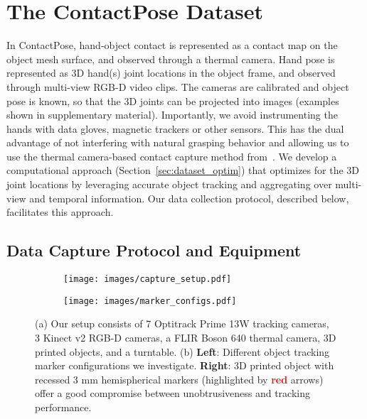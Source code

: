 \documentclass[runningheads]{llncs}
\begin{document}
 \section{The ContactPose Dataset} \label{sec:dataset}
In ContactPose, hand-object contact is represented as a contact map on the object mesh surface, and observed through a thermal camera. Hand pose is represented as 3D hand(s) joint locations in the object frame, and observed through multi-view RGB-D video clips. The cameras are calibrated and object pose is known, so that the 3D joints can be projected into images (examples shown in supplementary material). Importantly, we avoid instrumenting the hands with data gloves, magnetic trackers or other sensors. This has the dual advantage of not interfering with natural grasping behavior and allowing us to use the thermal camera-based contact capture method from~\cite{contactdbv1}. We develop a computational approach (Section~\ref{sec:dataset_optim}) that optimizes for the 3D joint locations by leveraging accurate object tracking and aggregating over multi-view and temporal information. Our data collection protocol, described below, facilitates this approach.

\subsection{Data Capture Protocol and Equipment}\label{sec:data_protocol}

\begin{figure*}
  \begin{subfigure}[b]{0.24\textwidth}
    \texttt{[image: images/capture\_setup.pdf]}
    \caption{}
    \label{fig:capture_setup}
  \end{subfigure}
  \begin{subfigure}[b]{0.74\textwidth}
    \texttt{[image: images/marker\_configs.pdf]}
    \caption{}
    \label{fig:marker_configs}
  \end{subfigure}
  \caption{(a) Our setup consists of 7 Optitrack Prime 13W tracking cameras, 3 Kinect v2 RGB-D cameras, a FLIR Boson 640 thermal camera, 3D printed objects, and a turntable. (b) \textbf{Left}: Different object tracking marker configurations we investigate. \textbf{Right}: 3D printed object with recessed 3 mm hemispherical markers (highlighted by \textbf{\textcolor{red}{red}} arrows) offer a good compromise between unobtrusiveness and tracking performance.}
\end{figure*}
\end{document}

